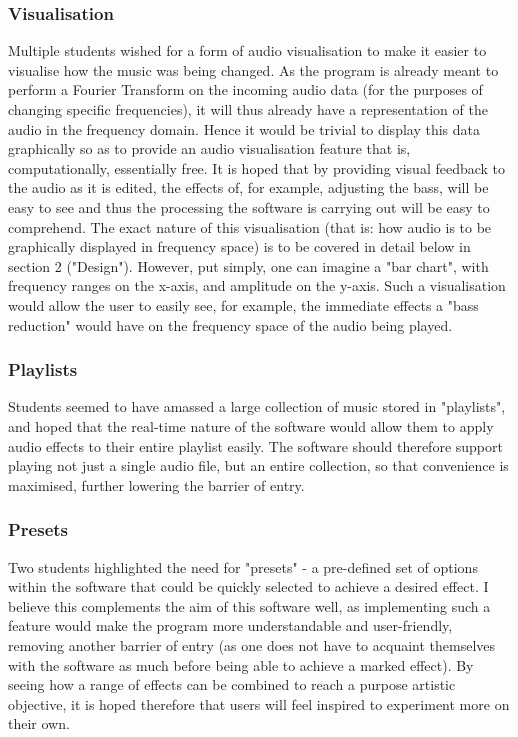 \subsubsection{Visualisation}
Multiple students wished for a form of audio visualisation to make it easier to visualise how the music was being changed. As the program is already meant to perform a Fourier Transform on the incoming audio data (for the purposes of changing specific frequencies), it will thus already have a representation of the audio in the frequency domain. Hence it would be trivial to display this data graphically so as to provide an audio visualisation feature that is, computationally, essentially free. It is hoped that by providing visual feedback to the audio as it is edited, the effects of, for example, adjusting the bass, will be easy to see and thus the processing the software is carrying out will be easy to comprehend. The exact nature of this visualisation (that is: how audio is to be graphically displayed in frequency space) is to be covered in detail below in section 2 ("Design"). However, put simply, one can imagine  a "bar chart", with frequency ranges on the x-axis, and amplitude on the y-axis. Such a visualisation would allow the user to easily see, for example, the immediate effects a "bass reduction" would have on the frequency space of the audio being played.

\subsubsection{Playlists}
Students seemed to have amassed a large collection of music stored in "playlists", and hoped that the real-time nature of the software would allow them to apply audio effects to their entire playlist easily. The software should therefore support playing not just a single audio file, but an entire collection, so that convenience is maximised, further lowering the barrier of entry.

\subsubsection{Presets}
Two students highlighted the need for "presets" - a pre-defined set of options within the software that could be quickly selected to achieve a desired effect. I believe this complements the aim of this software well, as implementing such a feature would make the program more understandable and user-friendly, removing another barrier of entry (as one does not have to acquaint themselves with the software as much before being able to achieve a marked effect). By seeing how a range of effects can be combined to reach a purpose artistic objective, it is hoped therefore that users will feel inspired to experiment more on their own.

